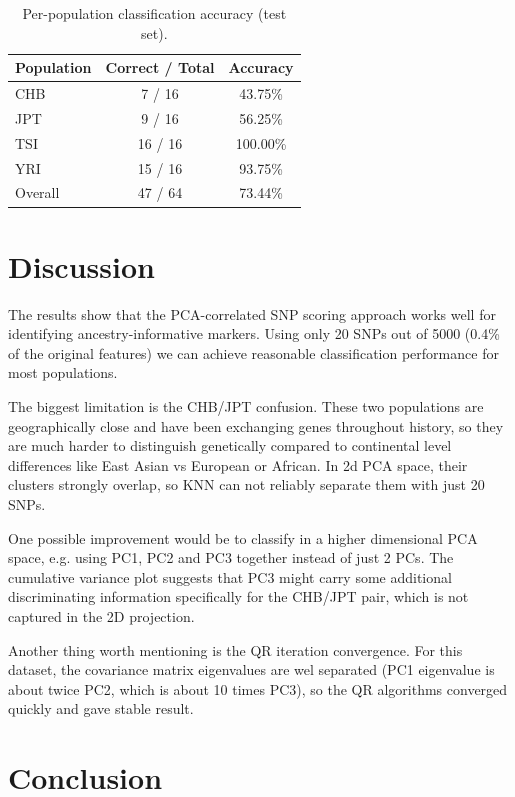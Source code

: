 \documentclass[conference]{IEEEtran}
\begin{document}
\begin{table}[h]
  \centering
  \caption{Per-population classification accuracy (test set).}
  \label{tab:acc}
  \begin{tabular}{lcc}
    \toprule
    Population & Correct / Total & Accuracy \\
    \midrule
    CHB & 7 / 16 & 43.75\% \\
    JPT & 9 / 16 & 56.25\% \\
    TSI & 16 / 16 & 100.00\% \\
    YRI & 15 / 16 & 93.75\% \\
    \midrule
    Overall & 47 / 64 & 73.44\% \\
    \bottomrule
  \end{tabular}
\end{table}

\section{Discussion}

The results show that the PCA-correlated SNP scoring approach works well for identifying ancestry-informative markers. Using only 20 SNPs out of 5000 (0.4\% of the original features) we can achieve reasonable classification performance for most populations.

The biggest  limitation is the CHB/JPT confusion. These two populations are geographically close and have been exchanging genes throughout history, so they are much harder to distinguish genetically compared to continental level differences like East Asian vs European or African. In 2d PCA space, their clusters strongly overlap, so KNN can not reliably separate them with just 20 SNPs.

One possible improvement would be to classify in a higher dimensional PCA space, e.g. using PC1, PC2 and PC3 together instead of just 2 PCs. The cumulative variance plot suggests that PC3 might carry some additional discriminating information specifically for the CHB/JPT pair, which is not captured in the 2D projection.

Another thing worth mentioning is the QR iteration convergence. For this dataset, the covariance matrix eigenvalues are wel separated (PC1 eigenvalue is about twice PC2, which is about 10 times PC3), so the QR algorithms converged quickly and gave stable result.

\section{Conclusion}
\end{document}
